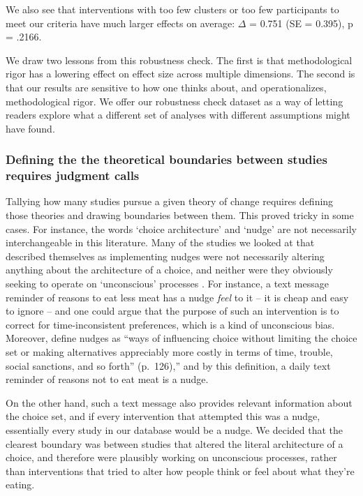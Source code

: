 \documentclass[sn-nature,pdflatex]{sn-jnl}
\begin{document}
We also see that interventions with too few clusters or too few
participants to meet our criteria have much larger effects on average:
\(\Delta\) = 0.751 (SE = 0.395), p = .2166.

We draw two lessons from this robustness check. The first is that
methodological rigor has a lowering effect on effect size across
multiple dimensions. The second is that our results are sensitive to how
one thinks about, and operationalizes, methodological rigor. We offer
our robustness check dataset as a way of letting readers explore what a
different set of analyses with different assumptions might have found.

\subsubsection{Defining the the theoretical boundaries between studies
requires judgment
calls}\label{defining-the-the-theoretical-boundaries-between-studies-requires-judgment-calls}

Tallying how many studies pursue a given theory of change requires
defining those theories and drawing boundaries between them. This proved
tricky in some cases. For instance, the words `choice architecture' and
`nudge' \citep{thaler2009} are not necessarily interchangeable in this
literature. Many of the studies we looked at that described themselves
as implementing nudges were not necessarily altering anything about the
architecture of a choice, and neither were they obviously seeking to
operate on `unconscious' processes \citep{garnett2020}. For instance, a
text message reminder of reasons to eat less meat has a nudge
\emph{feel} to it -- it is cheap and easy to ignore -- and one could
argue that the purpose of such an intervention is to correct for
time-inconsistent preferences, which is a kind of unconscious bias.
Moreover, \citep{hausman2010} define nudges as ``ways of influencing
choice without limiting the choice set or making alternatives
appreciably more costly in terms of time, trouble, social sanctions, and
so forth'' (p.~126),'' and by this definition, a daily text reminder of
reasons not to eat meat is a nudge.

On the other hand, such a text message also provides relevant
information about the choice set, and if every intervention that
attempted this was a nudge, essentially every study in our database
would be a nudge. We decided that the clearest boundary was between
studies that altered the literal architecture of a choice, and therefore
were plausibly working on unconscious processes, rather than
interventions that tried to alter how people think or feel about what
they're eating.
\end{document}
